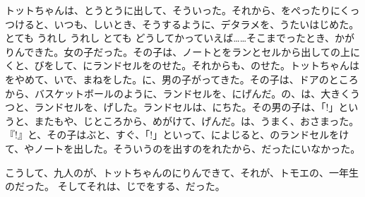 トットちゃんは、とうとうに出して、そういった。それから、をぺったりにくっつけると、いつも、しいとき、そうするように、デタラメを、うたいはじめた。 とても うれし うれし とても どうしてかっていえば……そこまでったとき、かがりんできた。女の子だった。その子は、ノートとをランとセルから出しての上にくと、びをして、にランドセルをのせた。それからも、のせた。トットちゃんはをやめて、いで、まねをした。に、男の子がってきた。その子は、ドアのところから、バスケットボールのように、ランドセルを、にげんだ。の、は、大きくうつと、ランドセルを、げした。ランドセルは、にちた。その男の子は、「!」というと、またもや、じところから、めがけて、げんだ。は、うまく、おさまった。『!』と、その子はぶと、すぐ、「!」といって、によじると、のランドセルをけて、やノートを出した。そういうのを出すのをれたから、だったにいなかった。

こうして、九人のが、トットちゃんのにりんできて、それが、トモエの、一年生のだった。 そしてそれは、じでをする、だった。



